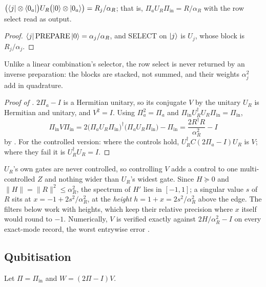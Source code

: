 \begin{lemma}
\label{lem:stack}
$\bigl(\bra j\otimes\bra{0_a}\bigr)U_R\bigl(\ket0\otimes\ket{0_a}\bigr)=R_j/\alpha_R$; that is, $\Pi_aU_R\Pi_{\mathrm{in}}=R/\alpha_R$ with the row select read as output.
\end{lemma}
\begin{proof}
$\bra j\mathrm{PREPARE}\ket0=\alpha_j/\alpha_R$, and SELECT on $\ket j$ is $U_j$, whose block is $R_j/\alpha_j$.
\end{proof}

Unlike a linear combination's selector, the row select is never returned by an inverse preparation: the blocks are stacked, not summed, and their weights $\alpha_j^2$ add in quadrature.

\begin{proof}[Proof of ]
$2\Pi_a-I$ is a Hermitian unitary, so its conjugate $V$ by the unitary $U_R$ is Hermitian and unitary, and $V^2=I$. Using $\Pi_a^2=\Pi_a$ and $\Pi_{\mathrm{in}}U_R^\dagger U_R\Pi_{\mathrm{in}}=\Pi_{\mathrm{in}}$,
\begin{equation*}
    \Pi_{\mathrm{in}}V\Pi_{\mathrm{in}}
    =2\bigl(\Pi_aU_R\Pi_{\mathrm{in}}\bigr)^\dagger\bigl(\Pi_aU_R\Pi_{\mathrm{in}}\bigr)-\Pi_{\mathrm{in}}
    =\frac{2R^\dagger R}{\alpha_R^2}-I
\end{equation*}
by . For the controlled version: where the controls hold, $U_R^\dagger C(2\Pi_a-I)U_R$ is $V$; where they fail it is $U_R^\dagger U_R=I$.
\end{proof}

$U_R$'s own gates are never controlled, so controlling $V$ adds a control to one multi-controlled $Z$ and nothing wider than $U_R$'s widest gate. Since $H\succeq0$ and $\|H\|=\|R\|^2\le\alpha_R^2$, the spectrum of $H'$ lies in $[-1,1]$; a singular value $s$ of $R$ sits at $x=-1+2s^2/\alpha_R^2$, at the \emph{height} $h=1+x=2s^2/\alpha_R^2$ above the edge. The filters below work with heights, which keep their relative precision where $x$ itself would round to $-1$. Numerically, $V$ is verified exactly against $2H/\alpha_R^2-I$ on every exact-mode record, the worst entrywise error .

\subsection{Qubitisation}
\label{app:qubitisation}

Let $\Pi=\Pi_{\mathrm{in}}$ and $W=(2\Pi-I)V$.

